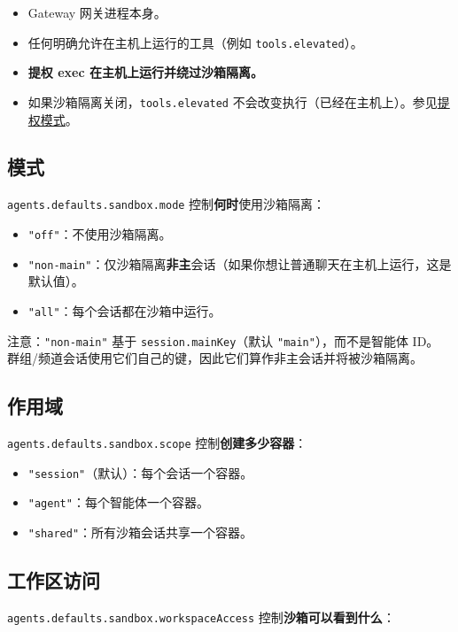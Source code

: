 \begin{itemize}
  \item Gateway 网关进程本身。
  \item 任何明确允许在主机上运行的工具（例如 \texttt{tools.elevated}）。
  \item \textbf{提权 exec 在主机上运行并绕过沙箱隔离。}
  \item 如果沙箱隔离关闭，\texttt{tools.elevated} 不会改变执行（已经在主机上）。参见\href{/tools/elevated}{提权模式}。
\end{itemize}


\subsection{模式}


\texttt{agents.defaults.sandbox.mode} 控制\textbf{何时}使用沙箱隔离：

\begin{itemize}
  \item \texttt{"off"}：不使用沙箱隔离。
  \item \texttt{"non-main"}：仅沙箱隔离\textbf{非主}会话（如果你想让普通聊天在主机上运行，这是默认值）。
  \item \texttt{"all"}：每个会话都在沙箱中运行。
\end{itemize}

注意：\texttt{"non-main"} 基于 \texttt{session.mainKey}（默认 \texttt{"main"}），而不是智能体 ID。
群组/频道会话使用它们自己的键，因此它们算作非主会话并将被沙箱隔离。

\subsection{作用域}


\texttt{agents.defaults.sandbox.scope} 控制\textbf{创建多少容器}：

\begin{itemize}
  \item \texttt{"session"}（默认）：每个会话一个容器。
  \item \texttt{"agent"}：每个智能体一个容器。
  \item \texttt{"shared"}：所有沙箱会话共享一个容器。
\end{itemize}


\subsection{工作区访问}


\texttt{agents.defaults.sandbox.workspaceAccess} 控制\textbf{沙箱可以看到什么}：

